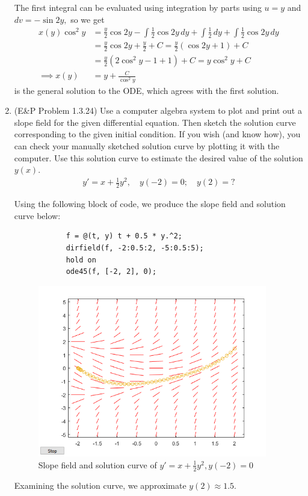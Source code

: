 \documentclass{article}
\begin{document}
\begin{enumerate}
\begin{soln}
			The first integral can be evaluated using integration by parts using $u=y$ and $dv=-\sin 2y,$ so we get 
			\begin{align*}
				x(y)\cos^2 y &= \frac{y}{2}\cos 2y - \int \frac{1}{2}\cos 2y\, dy + \int\frac{1}{2}\, dy + \int\frac{1}{2}\cos 2y\, dy \\
				&= \frac{y}{2}\cos 2y + \frac{y}{2}  + C = \frac{y}{2}\left( \cos 2y + 1 \right) + C \\
				&= \frac{y}{2}\left( 2\cos^2y-1+1 \right) + C = y\cos^2y + C \\
				\implies x(y) &= \boxed{y + \frac{C}{\cos^2 y}}
			\end{align*}
			is the general solution to the ODE, which agrees with the first solution.

		\end{soln}

		\newpage
	\item (E\&P Problem 1.3.24) Use a computer algebra system to plot and print out a slope field for the given differential equation. Then sketch the solution curve corresponding to the given initial condition. If you wish (and know how), you can check your manually sketched solution curve by plotting it with the computer. Use this solution curve to estimate the desired value of the solution $y(x).$
		\begin{align*}
			y'=x+\frac{1}{2} y^2, \quad y(-2)=0; \quad y(2)=?
		\end{align*}
		\begin{soln}
			Using the following block of code, we produce the slope field and solution curve below:
			\begin{lstlisting}
			f = @(t, y) t + 0.5 * y.^2;
			dirfield(f, -2:0.5:2, -5:0.5:5);
			hold on
			ode45(f, [-2, 2], 0);
			\end{lstlisting}
			\begin{figure}[h]
				\centering
				\includegraphics[width=10cm]{3slopefield}
				\caption{Slope field and solution curve of $y'=x+\frac{1}{2}y^2, y(-2)=0$}
			\end{figure}
			Examining the solution curve, we approximate $\boxed{y(2)\approx 1.5.}$
		\end{soln}


\end{enumerate}
\end{document}
